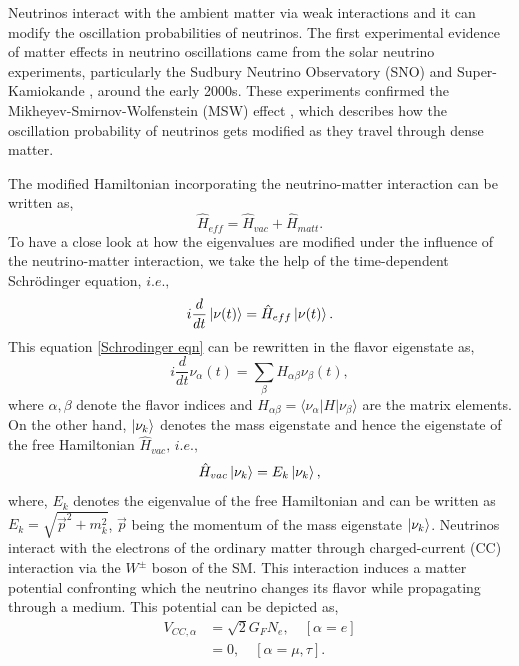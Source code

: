 Neutrinos interact with the ambient matter via weak interactions and it can modify the oscillation probabilities of neutrinos. The first experimental evidence of matter effects in neutrino oscillations came from the solar neutrino experiments, particularly the Sudbury Neutrino Observatory (SNO) \cite{SNO:2002hgz} and Super-Kamiokande \cite{Super-Kamiokande:2013mie}, around the early 2000s. These experiments confirmed the Mikheyev-Smirnov-Wolfenstein (MSW) effect \cite{Wolfenstein:1977ue, Mikheyev:1989dy, Mikheyev:1985zog}, which describes how the oscillation probability of neutrinos gets modified as they travel through dense matter.
\par The modified Hamiltonian incorporating the neutrino-matter interaction can be written as,
\begin{equation}
    \hat{H}_{eff} = \hat{H}_{vac}+ \hat{H}_{matt}.
    \label{eq:general hamiltonian matter effect}
\end{equation}
To have a close look at how the eigenvalues are modified under the influence of the neutrino-matter interaction, we take the help of the time-dependent Schr\"{o}dinger equation, $i.e.,$
\begin{equation}
    i \frac{d}{dt} \ket{\nu(t)} = \hat{H}_{eff} \ket{\nu(t)}.
    \label{Schrodinger eqn}
\end{equation}
This equation \ref{Schrodinger eqn} can be rewritten in the flavor eigenstate as,
\begin{equation}
    i \frac{d}{dt} \nu_{\alpha} (t) = \sum_{\beta} H_{\alpha\beta} \nu_{\beta} (t),
\end{equation}
where $\alpha,\beta$ denote the flavor indices and $H_{\alpha\beta}= \langle \nu_\alpha | H | \nu_\beta \rangle$ are the matrix elements. On the other hand, $\ket{\nu_k}$ denotes the mass eigenstate and hence the eigenstate of the free Hamiltonian $\hat{H}_{vac},\, i.e.,$
\begin{equation}
\hat{H}_{vac} \ket{\nu_k} = E_k\ket{\nu_k},
\label{vacuum equation}
\end{equation}
where, $E_k$ denotes the eigenvalue of the free Hamiltonian and can be written as $E_k=\sqrt{\vec{p}^2+m^2_k}$, $\vec{p}$ being the momentum of the mass eigenstate $\ket{\nu_k}$. Neutrinos interact with the electrons of the ordinary matter through charged-current (CC) interaction via the $W^\pm$ boson of the SM. This interaction induces a matter potential confronting which the neutrino changes its flavor while propagating through a medium. This potential can be depicted as,
\begin{align}
    V_{CC,\alpha} &= \sqrt{2} G_F N_e, \quad [\alpha = e] \\\nonumber
    &= 0, \quad [\alpha = \mu,\tau].
    \label{eq:V_cc}
\end{align}
